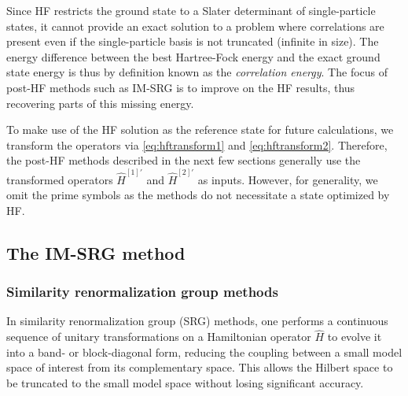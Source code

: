Since HF restricts the ground state to a Slater determinant of single-particle
states, it cannot provide an exact solution to a problem where correlations
are present even if the single-particle basis is not truncated (infinite in size).  The
energy difference between the best Hartree-Fock energy and the exact ground
state energy is thus by definition known as the \textit{correlation energy}.
The focus of post-HF methods such as IM-SRG is to improve on the HF results,
thus recovering parts of this missing energy.

To make use of the HF solution as the reference state for future calculations, we transform the operators via \eqref{eq:hftransform1} and \eqref{eq:hftransform2}.  Therefore, the post-HF methods described in the next few sections generally use the transformed operators $\hat{H}^{[1] \prime}$ and $\hat{H}^{[2] \prime}$ as inputs.  However, for generality, we omit the prime symbols as the methods do not necessitate a state optimized by HF.

\subsection{The IM-SRG method}
\label{subsec:imsrgmethod}

\subsubsection{Similarity renormalization group methods}
\label{subsubsec:srgmethods}

In similarity renormalization group (SRG) methods, one performs a continuous
sequence of unitary transformations on a Hamiltonian operator $\hat H$ to
evolve it into a band- or block-diagonal form, reducing the coupling between a
small model space of interest from its complementary space.  This allows the
Hilbert space to be truncated to the small model space without losing
significant accuracy.

